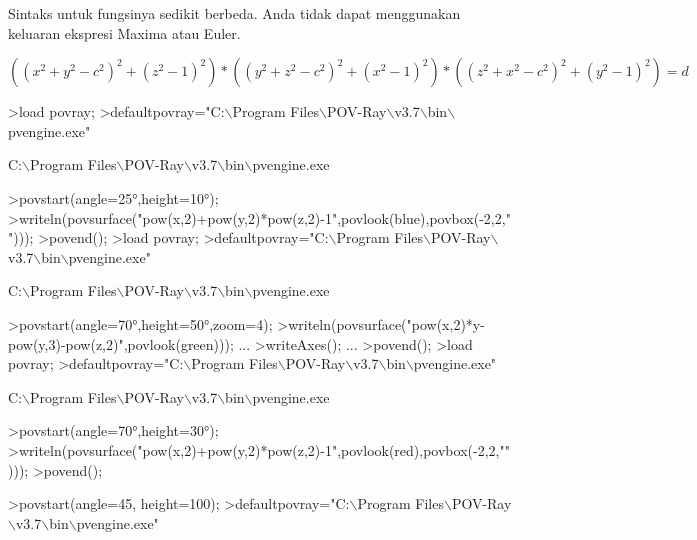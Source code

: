 \documentclass[a4paper,10pt]{article}
\begin{document}
\begin{eulernotebook}
\begin{eulercomment}
\begin{eulercomment}
\begin{eulercomment}
Sintaks untuk fungsinya sedikit berbeda. Anda tidak dapat menggunakan
keluaran ekspresi Maxima atau Euler.

\end{eulercomment}
\begin{eulerformula}
\[
((x^2+y^2-c^2)^2+(z^2-1)^2)*((y^2+z^2-c^2)^2+(x^2-1)^2)*((z^2+x^2-c^2)^2+(y^2-1)^2)=d
\]
\end{eulerformula}
\begin{eulerprompt}
>load povray;
>defaultpovray="C:\(\backslash\)Program Files\(\backslash\)POV-Ray\(\backslash\)v3.7\(\backslash\)bin\(\backslash\)pvengine.exe"
\end{eulerprompt}
\begin{euleroutput}
  C:\(\backslash\)Program Files\(\backslash\)POV-Ray\(\backslash\)v3.7\(\backslash\)bin\(\backslash\)pvengine.exe
\end{euleroutput}
\begin{eulerprompt}
>povstart(angle=25°,height=10°);
>writeln(povsurface("pow(x,2)+pow(y,2)*pow(z,2)-1",povlook(blue),povbox(-2,2,"")));
>povend();
>load povray;
>defaultpovray="C:\(\backslash\)Program Files\(\backslash\)POV-Ray\(\backslash\)v3.7\(\backslash\)bin\(\backslash\)pvengine.exe"
\end{eulerprompt}
\begin{euleroutput}
  C:\(\backslash\)Program Files\(\backslash\)POV-Ray\(\backslash\)v3.7\(\backslash\)bin\(\backslash\)pvengine.exe
\end{euleroutput}
\begin{eulerprompt}
>povstart(angle=70°,height=50°,zoom=4);
>writeln(povsurface("pow(x,2)*y-pow(y,3)-pow(z,2)",povlook(green))); ...
>writeAxes(); ...
>povend();
>load povray;
>defaultpovray="C:\(\backslash\)Program Files\(\backslash\)POV-Ray\(\backslash\)v3.7\(\backslash\)bin\(\backslash\)pvengine.exe"
\end{eulerprompt}
\begin{euleroutput}
  C:\(\backslash\)Program Files\(\backslash\)POV-Ray\(\backslash\)v3.7\(\backslash\)bin\(\backslash\)pvengine.exe
\end{euleroutput}
\begin{eulerprompt}
>povstart(angle=70°,height=30°);
>writeln(povsurface("pow(x,2)+pow(y,2)*pow(z,2)-1",povlook(red),povbox(-2,2,"")));
>povend();
\end{eulerprompt}
\begin{eulerprompt}
>povstart(angle=45, height=100);
>defaultpovray="C:\(\backslash\)Program Files\(\backslash\)POV-Ray\(\backslash\)v3.7\(\backslash\)bin\(\backslash\)pvengine.exe"

\end{eulerprompt}
\end{eulercomment}
\end{eulercomment}
\end{eulernotebook}
\end{document}
